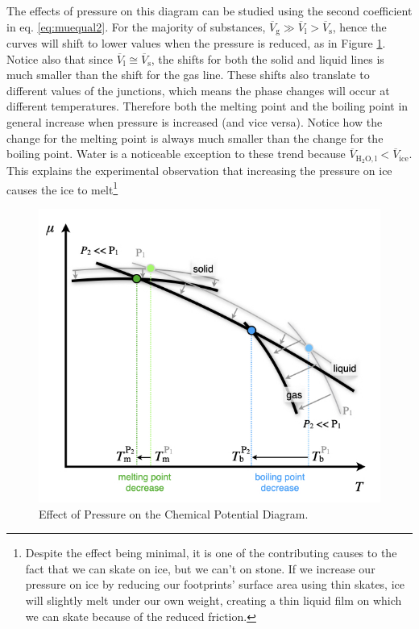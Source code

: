 \documentclass[
  9pt,
]{extbook}
\theoremstyle{definition}
\theoremstyle{definition}
\theoremstyle{definition}
\theoremstyle{remark}
\begin{document}
The effects of pressure on this diagram can be studied using the second coefficient in eq. \eqref{eq:muequal2}. For the majority of substances, \(\overline{V}_{\text{g}} \gg \overline{V}_{\text{l}} > \overline{V}_{\text{s}}\), hence the curves will shift to lower values when the pressure is reduced, as in Figure \ref{fig:FigPhase2}. Notice also that since \(\overline{V}_{\text{l}} \cong \overline{V}_{\text{s}}\), the shifts for both the solid and liquid lines is much smaller than the shift for the gas line. These shifts also translate to different values of the junctions, which means the phase changes will occur at different temperatures. Therefore both the melting point and the boiling point in general increase when pressure is increased (and vice versa). Notice how the change for the melting point is always much smaller than the change for the boiling point.
Water is a noticeable exception to these trend because \(\overline{V}_{\mathrm{H}_2\mathrm{O,l}} < \overline{V}_{\text{ice}}\). This explains the experimental observation that increasing the pressure on ice causes the ice to melt\footnote{Despite the effect being minimal, it is one of the contributing causes to the fact that we can skate on ice, but we can't on stone. If we increase our pressure on ice by reducing our footprints' surface area using thin skates, ice will slightly melt under our own weight, creating a thin liquid film on which we can skate because of the reduced friction.}

\begin{figure}

{\centering \includegraphics[width=0.6\linewidth]{./img/OEP_Figures.017} 

}

\caption{Effect of Pressure on the Chemical Potential Diagram.}\label{fig:FigPhase2}
\end{figure}
\end{document}

